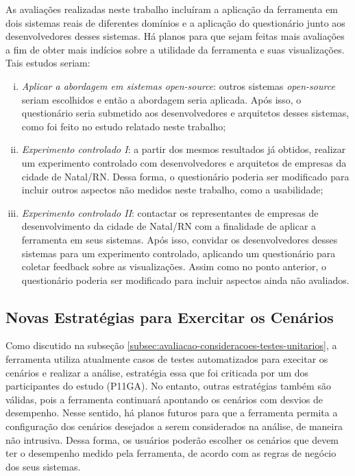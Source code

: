As avaliações realizadas neste trabalho incluíram a aplicação da ferramenta em dois sistemas reais de diferentes domínios e a aplicação do questionário junto aos desenvolvedores desses sistemas. Há planos para que sejam feitas mais avaliações a fim de obter mais indícios sobre a utilidade da ferramenta e suas visualizações. Tais estudos seriam:
\begin{enumerate}[(i)]
	\item \textit{Aplicar a abordagem em sistemas open-source}: outros sistemas \textit{open-source} seriam escolhidos e então a abordagem seria aplicada. Após isso, o questionário seria submetido aos desenvolvedores e arquitetos desses sistemas, como foi feito no estudo relatado neste trabalho;
	\item \textit{Experimento controlado I}: a partir dos mesmos resultados já obtidos, realizar um experimento controlado com desenvolvedores e arquitetos de empresas da cidade de Natal/RN. Dessa forma, o questionário poderia ser modificado para incluir outros aspectos não medidos neste trabalho, como a usabilidade;
	\item \textit{Experimento controlado II}: contactar os representantes de empresas de desenvolvimento da cidade de Natal/RN com a finalidade de aplicar a ferramenta em seus sistemas. Após isso, convidar os desenvolvedores desses sistemas para um experimento controlado, aplicando um questionário para coletar feedback sobre as visualizações. Assim como no ponto anterior, o questionário poderia ser modificado para incluir aspectos ainda não avaliados.
\end{enumerate}

\subsection{Novas Estratégias para Exercitar os Cenários} \label{subsec:consideracoes-novas-estrategias-exercitar-cenarios}

Como discutido na subseção \ref{subsec:avaliacao-consideracoes-testes-unitarios}, a ferramenta utiliza atualmente casos de testes automatizados para execitar os cenários e realizar a análise, estratégia essa que foi criticada por um dos participantes do estudo (P11GA). No entanto, outras estratégias também são válidas, pois a ferramenta continuará apontando os cenários com desvios de desempenho. Nesse sentido, há planos futuros para que a ferramenta permita a configuração dos cenários desejados a serem considerados na análise, de maneira não intrusiva. Dessa forma, os usuários poderão escolher os cenários que devem ter o desempenho medido pela ferramenta, de acordo com as regras de negócio dos seus sistemas.

